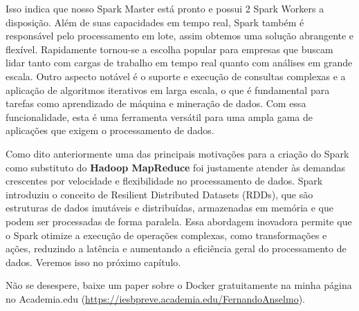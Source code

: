 Isso indica que nosso Spark Master está pronto e possui 2 Spark Workers a disposição. 
Além de suas capacidades em tempo real, Spark também é responsável pelo processamento em lote, assim obtemos uma solução abrangente e flexível. Rapidamente tornou-se a escolha popular para empresas que buscam lidar tanto com cargas de trabalho em tempo real quanto com análises em grande escala. Outro aspecto notável é o suporte e execução de consultas complexas e a aplicação de algoritmos iterativos em larga escala, o que é fundamental para tarefas como aprendizado de máquina e mineração de dados. Com essa funcionalidade, esta é uma ferramenta versátil para uma ampla gama de aplicações que exigem o processamento de dados.

Como dito anteriormente uma das principais motivações para a criação do Spark como substituto do \textbf{Hadoop MapReduce} foi justamente atender às demandas crescentes por velocidade e flexibilidade no processamento de dados. Spark introduziu o conceito de Resilient Distributed Datasets (RDDs), que são estruturas de dados imutáveis e distribuídas, armazenadas em memória e que podem ser processadas de forma paralela. Essa abordagem inovadora permite que o Spark otimize a execução de operações complexas, como transformações e ações, reduzindo a latência e aumentando a eficiência geral do processamento de dados. Veremos isso no próximo capítulo.	

\begin{note} 
	Não se desespere, baixe um paper sobre o Docker gratuitamente na minha página no Academia.edu (\url{https://iesbpreve.academia.edu/FernandoAnselmo}).
\end{note}

\clearpage